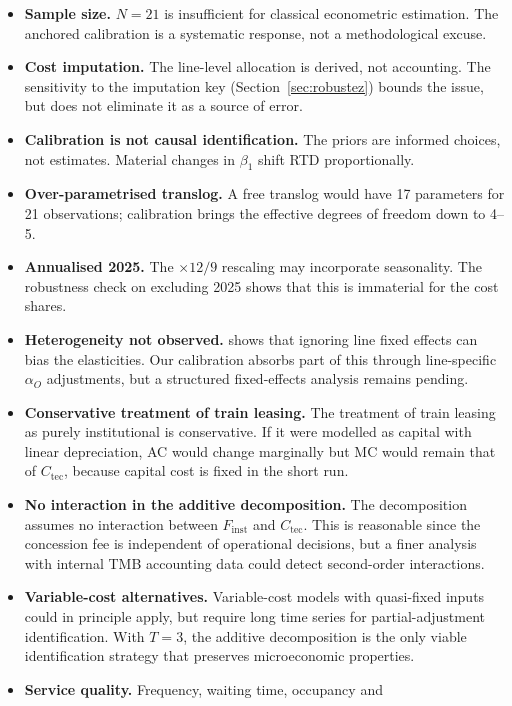\documentclass[11pt,a4paper]{article}
\begin{document}
\begin{itemize}[leftmargin=*,topsep=2pt]
\item \textbf{Sample size.} $N=21$ is insufficient for classical
econometric estimation. The anchored calibration is a systematic
response, not a methodological excuse.
\item \textbf{Cost imputation.} The line-level allocation is derived,
not accounting. The sensitivity to the imputation key
(Section~\ref{sec:robustez}) bounds the issue, but does not eliminate
it as a source of error.
\item \textbf{Calibration is not causal identification.} The priors are
informed choices, not estimates. Material changes in $\beta_1$ shift
RTD proportionally.
\item \textbf{Over-parametrised translog.} A free translog would have
17 parameters for 21 observations; calibration brings the effective
degrees of freedom down to 4--5.
\item \textbf{Annualised 2025.} The $\times 12/9$ rescaling may
incorporate seasonality. The robustness check on excluding 2025 shows
that this is immaterial for the cost shares.
\item \textbf{Heterogeneity not observed.} \citet{farsi2006} shows that
ignoring line fixed effects can bias the elasticities. Our calibration
absorbs part of this through line-specific $\alpha_O$ adjustments, but
a structured fixed-effects analysis remains pending.
\item \textbf{Conservative treatment of train leasing.} The treatment of
train leasing as purely institutional is conservative. If it were
modelled as capital with linear depreciation, AC would change
marginally but MC would remain that of $C_{\text{tec}}$, because capital
cost is fixed in the short run.
\item \textbf{No interaction in the additive decomposition.} The
decomposition assumes no interaction between $F_{\text{inst}}$ and
$C_{\text{tec}}$. This is reasonable since the concession fee is
independent of operational decisions, but a finer analysis with internal
TMB accounting data could detect second-order interactions.
\item \textbf{Variable-cost alternatives.} Variable-cost models with
quasi-fixed inputs \citep{cavesswanson1981} could in principle apply,
but require long time series for partial-adjustment identification.
With $T=3$, the additive decomposition is the only viable identification
strategy that preserves microeconomic properties.
\item \textbf{Service quality.} Frequency, waiting time, occupancy and

\end{itemize}
\end{document}
